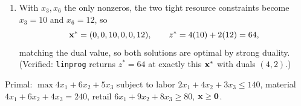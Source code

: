 \begin{enumerate}
\[
\begin{aligned}
x_1&: & 4 + 2(2) &= 8 > 3 &&\Rightarrow x_1 = 0, &
x_2&: & 2(4) &= 8 > 2 &&\Rightarrow x_2 = 0, \\
x_4&: & 2 &> 1 &&\Rightarrow x_4 = 0, &
x_5&: & 4 + 3(2) &= 10 > 5 &&\Rightarrow x_5 = 0,
\end{aligned}
\]
while the constraints for $x_3$ ($y_1 \ge 4$, tight) and $x_6$ ($y_2 \ge 2$, tight) allow $x_3, x_6 > 0$. The basic variables are $x_3$ and $x_6$.
\item With $x_3, x_6$ the only nonzeros, the two tight resource constraints become $x_3 = 10$ and $x_6 = 12$, so
\[
\mathbf{x}^* = (0, 0, 10, 0, 0, 12), \qquad z^* = 4(10) + 2(12) = 64,
\]
matching the dual value, so both solutions are optimal by strong duality. (Verified: \texttt{linprog} returns $z^* = 64$ at exactly this $\mathbf{x}^*$ with duals $(4, 2)$.)
\end{enumerate}


Primal: $\max 4x_1 + 6x_2 + 5x_3$ subject to labor $2x_1 + 4x_2 + 3x_3 \le 140$, material $4x_1 + 6x_2 + 4x_3 = 240$, retail $6x_1 + 9x_2 + 8x_3 \ge 80$, $\mathbf{x} \ge \mathbf{0}$.

